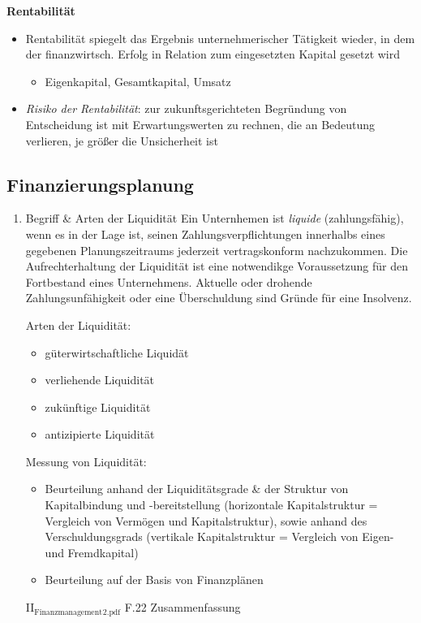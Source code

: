 \documentclass[11pt]{article}
\begin{document}
\begin{enumerate}
\textbf{Rentabilität}
\begin{itemize}
\item Rentabilität spiegelt das Ergebnis unternehmerischer Tätigkeit wieder, in dem der finanzwirtsch. Erfolg in Relation zum eingesetzten Kapital gesetzt wird 
\begin{itemize}
\item Eigenkapital, Gesamtkapital, Umsatz
\end{itemize}
\item \emph{Risiko der Rentabilität}: zur zukunftsgerichteten Begründung von Entscheidung ist mit Erwartungswerten zu rechnen, die an Bedeutung verlieren, je größer die Unsicherheit ist
\end{itemize}
\end{enumerate}

\subsection{Finanzierungsplanung}
\label{sec:org4d55d98}
\begin{enumerate}
\item Begriff \& Arten der Liquidität
\label{sec:org2070e5e}
Ein Unternhemen ist \emph{liquide} (zahlungsfähig), wenn es in der Lage ist, seinen Zahlungsverpflichtungen innerhalbs eines gegebenen Planungszeitraums jederzeit vertragskonform nachzukommen. Die Aufrechterhaltung der Liquidität ist eine notwendikge Voraussetzung für den Fortbestand eines Unternehmens. Aktuelle oder drohende Zahlungsunfähigkeit oder eine Überschuldung sind Gründe für eine Insolvenz.

Arten der Liquidität:
\begin{itemize}
\item güterwirtschaftliche Liquidät
\item verliehende Liquidität
\item zukünftige Liquidität
\item antizipierte Liquidität
\end{itemize}

Messung von Liquidität:
\begin{itemize}
\item Beurteilung anhand der Liquiditätsgrade \& der Struktur von Kapitalbindung und -bereitstellung (horizontale Kapitalstruktur = Vergleich von Vermögen und Kapitalstruktur), sowie anhand des Verschuldungsgrads (vertikale Kapitalstruktur = Vergleich von Eigen- und Fremdkapital)
\item Beurteilung auf der Basis von Finanzplänen
\end{itemize}

II\(_{\text{Finanzmanagement}}\)\(_{\text{2.pdf}}\) F.22 Zusammenfassung
\end{enumerate}
\end{document}
